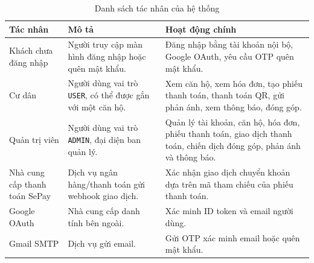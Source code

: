 ﻿\documentclass[12pt,a4paper]{report}
\begin{document}
\begin{table}[H]
\centering
\caption{Danh sách tác nhân của hệ thống}
\begin{tabularx}{\textwidth}{L{3cm} Y Y}
\toprule
Tác nhân & Mô tả & Hoạt động chính \\
\midrule
Khách chưa đăng nhập & Người truy cập màn hình đăng nhập hoặc quên mật khẩu. & Đăng nhập bằng tài khoản nội bộ, Google OAuth, yêu cầu OTP quên mật khẩu. \\
Cư dân & Người dùng vai trò \texttt{USER}, có thể được gắn với một căn hộ. & Xem căn hộ, xem hóa đơn, tạo phiếu thanh toán, thanh toán QR, gửi phản ánh, xem thông báo, đóng góp. \\
Quản trị viên & Người dùng vai trò \texttt{ADMIN}, đại diện ban quản lý. & Quản lý tài khoản, căn hộ, hóa đơn, phiếu thanh toán, giao dịch thanh toán, chiến dịch đóng góp, phản ánh và thông báo. \\
Nhà cung cấp thanh toán SePay & Dịch vụ ngân hàng/thanh toán gửi webhook giao dịch. & Xác nhận giao dịch chuyển khoản dựa trên mã tham chiếu của phiếu thanh toán. \\
Google OAuth & Nhà cung cấp danh tính bên ngoài. & Xác minh ID token và email người dùng. \\
Gmail SMTP & Dịch vụ gửi email. & Gửi OTP xác minh email hoặc quên mật khẩu. \\
\bottomrule
\end{tabularx}
\end{table}
\end{document}
